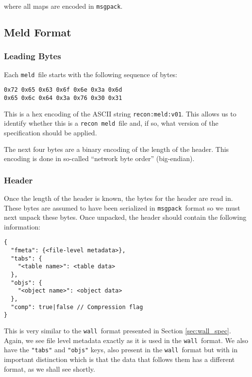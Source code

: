 \documentclass[11pt,a4paper,twocolumn]{article}
\newcommand{\recon}{\texttt{recon}}
\newcommand{\wall}{\texttt{wall}}
\newcommand{\meld}{\texttt{meld}}
\newcommand{\msgpack}{\texttt{msgpack}}
\newcommand{\code}[1]{\texttt{#1}} %
\begin{document}
where all maps are encoded in \msgpack.

\subsection{Meld Format}
\label{sec:meld_spec}

\subsubsection{Leading Bytes}

Each \meld\ file starts with the following sequence of bytes:

\begin{verbatim}
0x72 0x65 0x63 0x6f 0x6e 0x3a 0x6d
0x65 0x6c 0x64 0x3a 0x76 0x30 0x31
\end{verbatim}

This is a hex encoding of the ASCII string \code{recon:meld:v01}.
This allows us to identify whether this is a \recon\ \meld\ file and, if
so, what version of the specification should be applied.

The next four bytes are a binary encoding of the length of the header.
This encoding is done in so-called ``network byte order''
(big-endian).

\subsubsection{Header}
\label{sec:meld_head}

Once the length of the header is known, the bytes for the header are
read in.  These bytes are assumed to have been serialized in
\msgpack\ format so we must next unpack these bytes.  Once unpacked,
the header should contain the following information:

\begin{verbatim}
{
  "fmeta": {<file-level metadata>},
  "tabs": {
    "<table name>": <table data>
  },
  "objs": {
    "<object name>": <object data>
  },
  "comp": true|false // Compression flag
}
\end{verbatim}

This is very similar to the \wall\ format presented in Section
\ref{sec:wall_spec}.  Again, we see file level metadata exactly as it
is used in the \wall\ format.  We also have the \code{"tabs"} and
\code{"objs"} keys, also present in the \wall\ format but with in
important distinction which is that the data that follows them has a
different format, as we shall see shortly.
\end{document}
